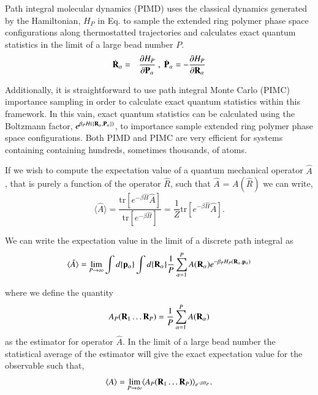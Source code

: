 \documentclass[phd,tocprelim]{cornell}
\begin{document}
Path integral molecular dynamics (PIMD) uses the classical dynamics generated by the Hamiltonian, $H_P$ in Eq. 
to sample the extended ring polymer phase space configurations along thermostatted trajectories and calculates exact quantum statistics in the limit of a large bead number $P$.
\begin{eqnarray}
\dot{{\bf{R}}}_{\alpha}&=& 
\frac{\partial H_P}{\partial
{\bf{P}}_{\alpha}}\;,\;
\dot{{\bf{P}}}_{\alpha}= -\frac{\partial
H_P}{\partial {\bf{R}}_{\alpha}}
\label{eq:eom2}
\end{eqnarray}


 Additionally, it is straightforward to use path integral Monte Carlo (PIMC) importance sampling in order to calculate exact quantum statistics within this framework. In this vain, exact quantum statistics can be calculated using the Boltzmann factor, $e^{\beta_P H(\{{\bf{R}}_{\alpha},{\bf{P}}_{\alpha}\})}$, to importance sample extended ring polymer phase space configurations. Both PIMD and PIMC are very efficient for systems containing containing hundreds, sometimes thousands, of atoms. 

If we wish to compute the expectation value of a quantum mechanical operator $\hat{A}$, that is purely a function of the operator $\hat{R}$, such that $\hat{A}$ = $A(\hat{R})$ we can write, 
\begin{equation}
\langle \hat{A} \rangle = \frac{\textrm{tr}[e^{-\beta \hat{H}} \hat{A}]}{\textrm{tr}[e^{-\beta \hat{H}}]} = \frac{1}{Z} \textrm{tr}[e^{-\beta \hat{H}} \hat{A}].
\end{equation}

We can write the expectation value in the limit of a discrete path integral as 
\begin{equation}
\langle \hat{A} \rangle= \lim_{P \to \infty} \int   d\{{\bf{p}}_{\alpha}\}\int   d\{{\bf{R}}_{\alpha}\} \frac{1}{P} \sum_{\alpha=1}^{P}A({\bf{R}}_{\alpha}) e^{-\beta_P H_P({\bf{R}}_{\alpha}, {\bf{p}}_{\alpha})}
\end{equation}

where we define the quantity 
\begin{equation}
A_P({\bf{R}}_1 \dots {\bf{R}}_P) =  \frac{1}{P} \sum_{\alpha=1}^{P}A({\bf{R}}_{\alpha}) 
\end{equation}
as the estimator for operator $\hat{A}$. In the limit of a large bead number the statistical average of the estimator will give the exact expectation value for the observable such that,
\begin{equation}
\langle A \rangle = \lim_{P\to \infty} \langle A_P( {\bf{R}}_1 \dots {\bf{R}}_P) \rangle_{e^{-\beta H_P}}. 
\end{equation}
\end{document}
